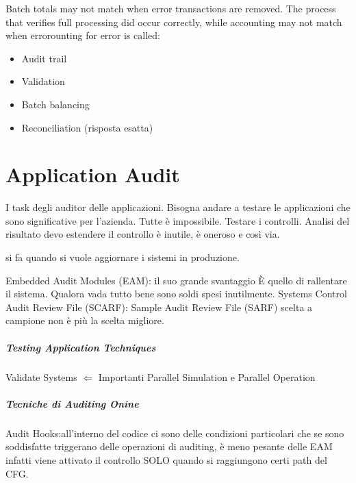 Batch totals may not match when error transactions are removed. The process that
verifies full processing did occur correctly, while accounting may not match
when errorounting for error is called:

\begin{itemize}
\item Audit trail
\item Validation
\item Batch balancing
\item Reconciliation (risposta esatta)
\end{itemize}



\chapter{Application Audit}

I task degli auditor delle applicazioni. Bisogna andare a testare le
applicazioni che sono significative per l'azienda. Tutte è impossibile.
Testare i controlli. Analisi del risultato devo estendere il controllo è
inutile, è oneroso e così via.



si fa quando si vuole aggiornare i sistemi in produzione.

Embedded Audit Modules (EAM): il suo grande svantaggio È quello di rallentare il
sistema. Qualora vada tutto bene sono soldi spesi inutilmente.
Systems Control Audit Review File (SCARF):
Sample Audit Review File (SARF) scelta a campione non è più la scelta migliore.

\paragraph{Testing Application Techniques}
Validate Systems $\Leftarrow$ Importanti Parallel Simulation e Parallel
Operation



\paragraph{Tecniche di Auditing Onine}
Audit Hooks:all'interno del codice ci sono delle condizioni particolari che se
sono soddisfatte triggerano delle operazioni di auditing, è meno pesante delle
EAM infatti viene attivato il controllo SOLO quando si raggiungono certi path
del CFG.


